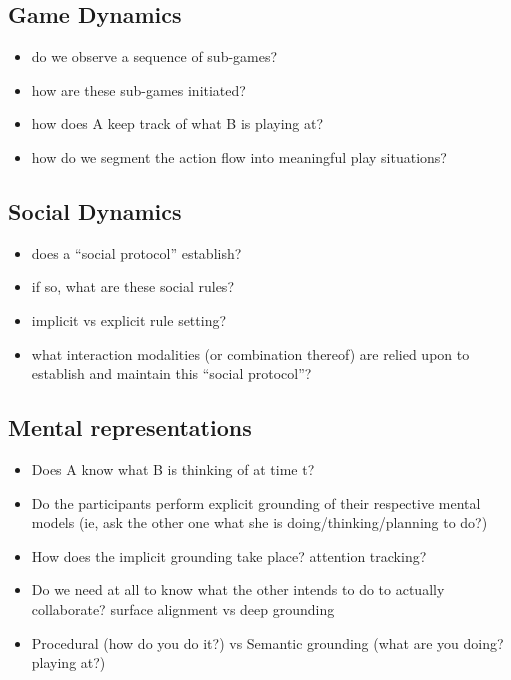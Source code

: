 \documentclass{article}
\begin{document}
\subsection{Game Dynamics}

\begin{itemize}
    \item do we observe a sequence of sub-games?
    \item how are these sub-games initiated?
    \item how does A keep track of what B is playing at?
    \item how do we segment the action flow into meaningful play situations?
\end{itemize}

\subsection{Social Dynamics}

\begin{itemize}
    \item does a ``social protocol'' establish?
    \item if so, what are these social rules?
    \item implicit vs explicit rule setting?
    \item what interaction modalities (or combination thereof) are relied upon
        to establish and maintain this ``social protocol''?
\end{itemize}

\subsection{Mental representations}

\begin{itemize}
    \item Does A know what B is thinking of at time t?
    \item Do the participants perform explicit grounding of their respective mental models
        (ie, ask the other one what she is doing/thinking/planning to do?)
    \item How does the implicit grounding take place? attention tracking?
    \item Do we need at all to know what the other intends to do to actually
        collaborate? surface alignment vs deep grounding
    \item Procedural (how do you do it?) vs Semantic
        grounding (what are you doing? playing at?)
\end{itemize}
\end{document}
